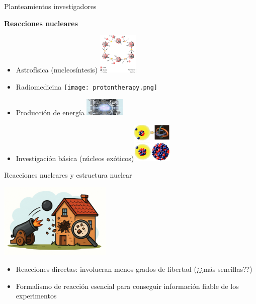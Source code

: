 \documentclass{beamer}
\begin{document}
\begin{frame}{Planteamientos investigadores}

    \textbf{Reacciones nucleares}    
    
    \begin{itemize}
    \item Astrofísica (nucleosíntesis) \hfill \includegraphics[width=0.15\textwidth]{CNO_cycle.png}
    
    \item Radiomedicina \hfill  \texttt{[image: protontherapy.png]}
    
    \item Producción de energía \hfill  \includegraphics[width=0.15\textwidth]{fusion.png}
    
    \item Investigación básica (núcleos exóticos)\hfill  \includegraphics[width=0.15\textwidth]{exotic.png}
    \end{itemize}
\end{frame}

\begin{frame}{Reacciones nucleares y estructura nuclear} 
    \begin{center}
    \includegraphics[width=0.4\textwidth]{cannon.png}
    \end{center}
    \begin{itemize}
    \item Reacciones directas: involucran menos grados de libertad (¿¿más sencillas??)
    \item Formalismo de reacción esencial para conseguir información fiable de los experimentos
    \end{itemize}
\end{frame}
\end{document}
